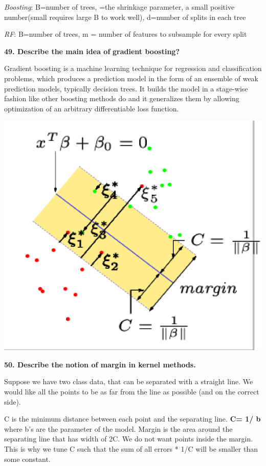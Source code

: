 \textit{Boosting}: B=number of trees, \textcrlambda=the shrinkage parameter, a
small positive number(small \textcrlambda requires large B to work well), d=number
of splits in each tree

\textit{RF}: B=number of trees, m = number of features to subsample
for every split

\textbf{49. Describe the main idea of} \textbf{gradient boosting?}

Gradient boosting is a machine learning technique for regression and
classification problems, which produces a prediction model in the form
of an ensemble of weak prediction models, typically decision trees. It
builds the model in a stage-wise fashion like other boosting methods do
and it generalizes them by allowing optimization of an arbitrary
differentiable loss function.

\includegraphics[width=\columnwidth]{media/image33.png}

\textbf{50. Describe the notion of margin in kernel methods.}

Suppose we have two class data, that can be separated with a straight
line. We would like all the points to be as far from the line as
possible (and on the correct side).

C is the minimum distance between each point and the separating line.
\textbf{C= 1/ \textbar b\textbar{}} where b's are the parameter of the
model. Margin is the area around the separating line that has width of
2C. We do not want points inside the margin. This is why we tune C such
that the sum of all errors * 1/C will be smaller than some constant.

